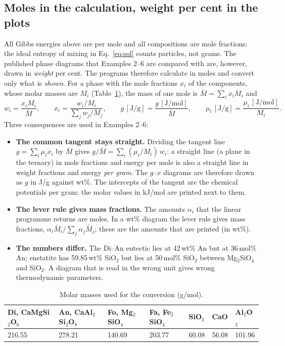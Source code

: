 \documentclass[11pt,a4paper]{article}
\begin{document}
\subsection{Moles in the calculation, weight per cent in the plots}\label{sec:weight}
All Gibbs energies above are per mole and all compositions are mole fractions: the ideal entropy of mixing in
Eq.~\eqref{eq:sol} counts particles, not grams. The published phase diagrams that Examples 2–6 are compared
with are, however, drawn in \emph{weight} per cent. The programs therefore calculate in moles and convert
only what is \emph{shown}. For a phase with the mole fractions $x_i$ of the components, whose molar masses
are $M_i$ (Table~\ref{tab:mass}), the mass of one mole is $\bar M = \sum_i x_i M_i$ and
\begin{equation}\label{eq:wt}
  w_i = \frac{x_i M_i}{\bar M}, \qquad
  x_i = \frac{w_i/M_i}{\sum_j w_j/M_j}, \qquad
  g\,[\mathrm{J/g}] = \frac{g\,[\mathrm{J/mol}]}{\bar M}, \qquad
  \mu_i\,[\mathrm{J/g}] = \frac{\mu_i\,[\mathrm{J/mol}]}{M_i} .
\end{equation}
Three consequences are used in Examples 2–6:
\begin{itemize}
\item \textbf{The common tangent stays straight.} Dividing the tangent line $g = \sum_i \mu_i x_i$ by $\bar M$
  gives $g/\bar M = \sum_i (\mu_i/M_i)\,w_i$: a straight line (a plane in the ternary) in mole fractions and
  energy per mole is also a straight line in weight fractions and energy \emph{per gram}. The $g$–$x$
  diagrams are therefore drawn as $g$ in J/g against wt\%. The intercepts of the tangent are the chemical
  potentials per gram; the molar values in kJ/mol are printed next to them.
\item \textbf{The lever rule gives mass fractions.} The amounts $\alpha_i$ that the linear programme returns
  are moles. In a wt\% diagram the lever rule gives mass fractions,
  $\alpha_i \bar M_i / \sum_j \alpha_j \bar M_j$; these are the amounts that are printed (in wt\%).
\item \textbf{The numbers differ.} The Di–An eutectic lies at 42\,wt\% An but at 36\,mol\% An; enstatite has
  59.85\,wt\% SiO$_2$ but lies at 50\,mol\% SiO$_2$ between Mg$_2$SiO$_4$ and SiO$_2$. A diagram that is read
  in the wrong unit gives wrong thermodynamic parameters.
\end{itemize}

\begin{table}[H]
\centering\small
\caption{Molar masses used for the conversion (g/mol).}\label{tab:mass}
\begin{tabular}{@{}lllllll@{}}
\toprule
Di, CaMgSi$_2$O$_6$ & An, CaAl$_2$Si$_2$O$_8$ & Fo, Mg$_2$SiO$_4$ & Fa, Fe$_2$SiO$_4$ & SiO$_2$ & CaO & Al$_2$O$_3$ \\
\midrule
216.55 & 278.21 & 140.69 & 203.77 & 60.08 & 56.08 & 101.96 \\
\bottomrule
\end{tabular}
\end{table}
\end{document}
